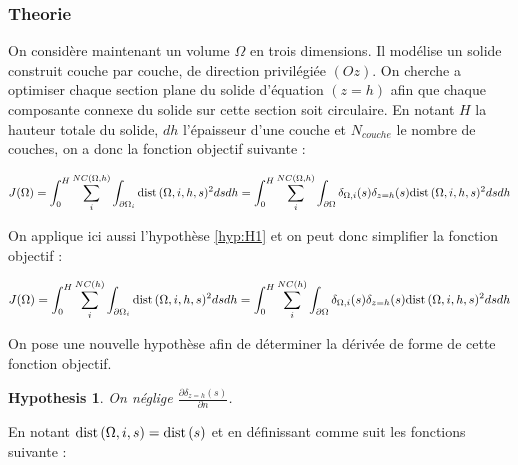 \documentclass[11pt,a4paper]{article}
\newtheorem{hypothese}[theorem]{Hypothesis}
\begin{document}
\subsubsection{Theorie}

On considère maintenant un volume $\Omega$ en trois dimensions. Il modélise un solide construit couche par couche, de direction privilégiée $(Oz)$. On cherche a optimiser chaque section plane du solide d'équation $(z=h)$ afin que chaque composante connexe du solide sur cette section soit circulaire. En notant $H$ la hauteur totale du solide, $dh$ l'épaisseur d'une couche et $N_{couche}$ le nombre de couches, on a donc la fonction objectif suivante :

\begin{equation}
J(\Omega)=\int_0^H \sum_{i}^{NC(\Omega,h)}\int_{\partial\Omega_{i}} \textrm{dist}\,(\Omega,i,h,s)^2dsdh=\int_0^H\sum_{i}^{NC(\Omega,h)}\int_{\partial\Omega} \delta_{\Omega,i}(s)\delta_{z=h}(s)\textrm{dist}\,(\Omega,i,h,s)^2dsdh
\end{equation}
 
On applique ici aussi l'hypothèse \ref{hyp:H1} et on peut donc simplifier la fonction objectif :

\begin{equation}
J(\Omega)=\int_0^H \sum_{i}^{NC(h)}\int_{\partial\Omega_{i}} \textrm{dist}\,(\Omega,i,h,s)^2dsdh=\int_0^H\sum_{i}^{NC(h)}\int_{\partial\Omega} \delta_{\Omega,i}(s)\delta_{z=h}(s)\textrm{dist}\,(\Omega,i,h,s)^2dsdh
\end{equation}

On pose une nouvelle hypothèse  afin de déterminer la dérivée de forme de cette fonction objectif.

\begin{hypothese}
	\label{hyp:H3}
	On néglige $\frac{\partial \delta_{z=h}(s)}{\partial n}$. 
\end{hypothese}

En notant $\textrm{dist}\,(\Omega,i,s)=\textrm{dist}\,(s)$ et en définissant comme suit les fonctions suivante :
\end{document}
